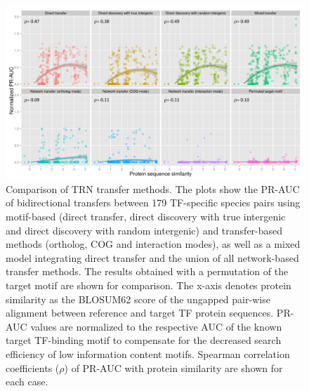 \begin{figure}
  \centering
  \includegraphics[width=\textwidth]{figures/chapter3/comparison-transfer-methods}
  \caption[Comparison of TRN transfer methods.]{Comparison of TRN transfer
    methods. The plots show the PR-AUC of bidirectional transfers between 179
    TF-specific species pairs using motif-based (direct transfer, direct
    discovery with true intergenic and direct discovery with random intergenic)
    and transfer-based methods (ortholog, COG and interaction modes), as well
    as a mixed model integrating direct transfer and the union of all
    network-based transfer methods. The results obtained with a permutation of
    the target motif are shown for comparison. The x-axis denotes protein
    similarity as the BLOSUM62 score of the ungapped pair-wise alignment
    between reference and target TF protein sequences. PR-AUC values are
    normalized to the respective AUC of the known target TF-binding motif to
    compensate for the decreased search efficiency of low information content
    motifs. Spearman correlation coefficients ($\rho$) of PR-AUC with protein
    similarity are shown for each case.}
\label{fig:comparison-transfer-methods}
\end{figure}

